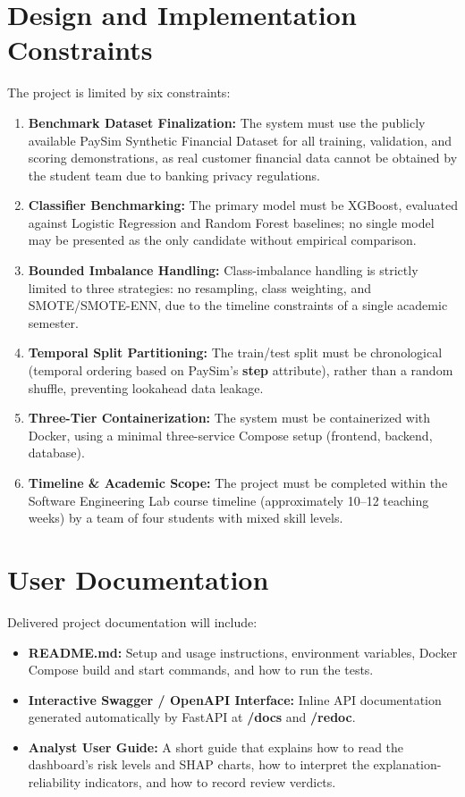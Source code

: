 \documentclass[12pt, a4paper]{report}
\begin{document}
\section{Design and Implementation Constraints}
The project is limited by six constraints:
\begin{enumerate}
    \item \textbf{Benchmark Dataset Finalization:} The system must use the publicly available PaySim Synthetic Financial Dataset for all training, validation, and scoring demonstrations, as real customer financial data cannot be obtained by the student team due to banking privacy regulations.
    \item \textbf{Classifier Benchmarking:} The primary model must be XGBoost, evaluated against Logistic Regression and Random Forest baselines; no single model may be presented as the only candidate without empirical comparison.
    \item \textbf{Bounded Imbalance Handling:} Class-imbalance handling is strictly limited to three strategies: no resampling, class weighting, and SMOTE/SMOTE-ENN, due to the timeline constraints of a single academic semester.
    \item \textbf{Temporal Split Partitioning:} The train/test split must be chronological (temporal ordering based on PaySim's \textbf{step} attribute), rather than a random shuffle, preventing lookahead data leakage.
    \item \textbf{Three-Tier Containerization:} The system must be containerized with Docker, using a minimal three-service Compose setup (frontend, backend, database).
    \item \textbf{Timeline \& Academic Scope:} The project must be completed within the Software Engineering Lab course timeline (approximately 10--12 teaching weeks) by a team of four students with mixed skill levels.
\end{enumerate}

\section{User Documentation}
Delivered project documentation will include:
\begin{itemize}
    \item \textbf{README.md:} Setup and usage instructions, environment variables, Docker Compose build and start commands, and how to run the tests.
    \item \textbf{Interactive Swagger / OpenAPI Interface:} Inline API documentation generated automatically by FastAPI at \textbf{/docs} and \textbf{/redoc}.
    \item \textbf{Analyst User Guide:} A short guide that explains how to read the dashboard's risk levels and SHAP charts, how to interpret the explanation-reliability indicators, and how to record review verdicts.
\end{itemize}
\end{document}
